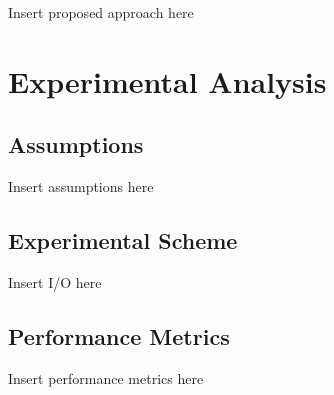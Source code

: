 \documentclass[conference]{IEEEtran}
\begin{document}
Insert proposed approach here


\section{Experimental Analysis}


\subsection{Assumptions}

Insert assumptions here


\subsection{Experimental Scheme}

Insert I/O here


\subsection{Performance Metrics}

Insert performance metrics here

\end{document}
